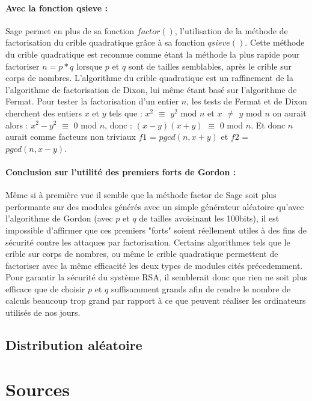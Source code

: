 \documentclass[a4paper,11pt]{article}
\begin{document}
\paragraph{ Avec la fonction qsieve : } \newline
Sage permet en plus de sa fonction $factor()$, l'utilisation de la méthode de factorisation du crible quadratique grâce à sa fonction $qsieve()$. Cette méthode du crible quadratique est reconnue comme étant la méthode la plus rapide pour factoriser $n=p*q$ lorsque $p$ et $q$ sont de tailles semblables, après le crible sur corps de nombres. L'algorithme du crible quadratique est un raffinement de la l'algorithme de factorisation de Dixon, lui même étant basé sur l'algorithme de Fermat.\newline
Pour tester la factorisation d'un entier $n$, les tests de Fermat et de Dixon cherchent des entiers $x$ et $y$ tels que : 
\smallbreak $x^{2}$ $\equiv$ $ y ^{2} $ mod $n$ et $x$ $\ne $ $ y $ mod $n$  \newline on aurait alors :
\smallbreak $x^{2} - y ^{2} $ $\equiv$ $0$ mod $n$, \newline  donc :
\smallbreak $(x-y)(x+y)$  $\equiv$ $0$ mod $n$.
\newline Et donc $n$ aurait comme facteurs non triviaux $f1$ = $pgcd(n,x+y)$ et $f2$ = $pgcd(n,x-y)$.

\paragraph{ Conclusion sur l'utilité des premiers forts de Gordon : }
Même si à première vue il semble  que la méthode factor de Sage soit plus performante sur des modules générés avec un simple générateur aléatoire qu'avec l'algorithme de Gordon (avec $p$ et $q$ de tailles avoisinant les 100bits), il est impossible d'affirmer que ces premiers "forts" soient réellement utiles à des fins de sécurité contre les attaques par factorisation. Certains algorithmes tels que le crible sur corps de nombres, ou même le crible quadratique permettent de factoriser avec la même efficacité les deux types de modules cités précedemment. Pour garantir la sécurité du système RSA, il semblerait donc que rien ne soit plus efficace que de choisir $p$ et $q$ suffisamment grands afin de rendre le nombre de calculs beaucoup trop grand par rapport à ce que peuvent réaliser les ordinateurs utilisés de nos jours.



\subsection{Distribution aléatoire}
\section*{Sources}




 
  
\end{document}
